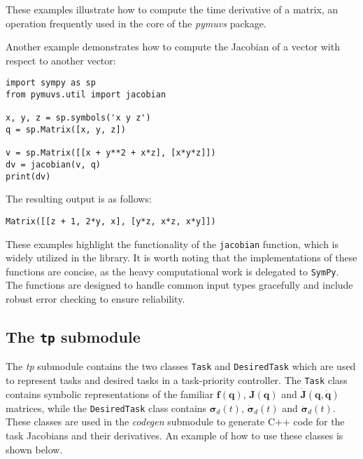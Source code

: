 These examples illustrate how to compute the time derivative of a matrix, an operation frequently used in the core of the \emph{pymuvs} package.

Another example demonstrates how to compute the Jacobian of a vector with respect to another vector:

\begin{lstlisting}[style=custompython,
    caption={Computing the Jacobian of a vector.},
    label={lst:usage:util:jacobian}]
import sympy as sp
from pymuvs.util import jacobian

x, y, z = sp.symbols('x y z')
q = sp.Matrix([x, y, z])

v = sp.Matrix([[x + y**2 + x*z], [x*y*z]])
dv = jacobian(v, q)
print(dv)
\end{lstlisting}

The resulting output is as follows:

\begin{lstlisting}[style=customtxt,
    caption={Output of \autoref{lst:usage:util:jacobian}.},
    label={lst:usage:util:jacobian:out}]
Matrix([[z + 1, 2*y, x], [y*z, x*z, x*y]])
\end{lstlisting}


These examples highlight the functionality of the \texttt{jacobian} function, which is widely utilized in the library. It is worth noting that the implementations of these functions are concise, as the heavy computational work is delegated to \texttt{SymPy}. The functions are designed to handle common input types gracefully and include robust error checking to ensure reliability.


\subsection{The \texttt{tp} submodule}
The \emph{tp} submodule contains the two classes \texttt{Task} and \texttt{DesiredTask}
which are used to represent tasks and desired tasks in a task-priority controller.
The \texttt{Task} class contains symbolic representations of the familiar $\bm{f}(\bm{q})$,
$\bm{J}(\bm{q})$ and $\dot{\bm{J}}(\bm{q},\dot{\bm{q}})$ matrices, while the \texttt{DesiredTask} class contains
$\bm{\sigma}_d(t)$, $\dot{\bm{\sigma}}_d(t)$ and $\ddot{\bm{\sigma}}_d(t)$. 
These classes are used in the \emph{codegen} submodule to generate C++ code for
the task Jacobians and their derivatives. An example of how to use these classes
is shown below.

